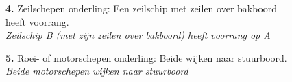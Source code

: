 \begin{figure}[H]
	\centering
	\begin{minipage}[t]{0.70\textwidth}
		\textbf{4.} Zeilschepen onderling: Een zeilschip met zeilen over bakboord heeft voorrang.\\
		\textit{Zeilschip B (met zijn zeilen over bakboord) heeft voorrang op A}
	\end{minipage}
	\hfill
	\begin{minipage}[t]{0.25\textwidth}
		\label{pic:tg4}
	\end{minipage}
	\hfill
\end{figure}
\vspace{-0.7cm}

\begin{figure}[H]
	\centering
	\begin{minipage}[t]{0.70\textwidth}
		\textbf{5.} Roei- of motorschepen onderling: Beide wijken naar stuurboord.\\
		\textit{Beide motorschepen wijken naar stuurboord}
	\end{minipage}
	\hfill
	\begin{minipage}[t]{0.25\textwidth}
		\label{pic:tg5}
	\end{minipage}
	\hfill
\end{figure}

